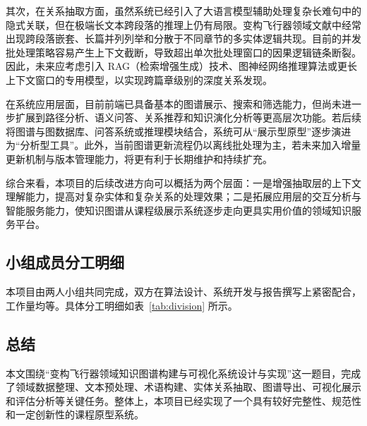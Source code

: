 其次，在关系抽取方面，虽然系统已经引入了大语言模型辅助处理复杂长难句中的隐式关联，但在极端长文本跨段落的推理上仍有局限。变构飞行器领域文献中经常出现跨段落嵌套、长篇并列列举和分散于不同章节的多实体逻辑共现。目前的并发批处理策略容易产生上下文截断，导致超出单次批处理窗口的因果逻辑链条断裂。因此，未来应考虑引入 RAG（检索增强生成）技术、图神经网络推理算法或更长上下文窗口的专用模型，以实现跨篇章级别的深度关系发现。

在系统应用层面，目前前端已具备基本的图谱展示、搜索和筛选能力，但尚未进一步扩展到路径分析、语义问答、关系推荐和知识演化分析等更高层次功能。若后续将图谱与图数据库、问答系统或推理模块结合，系统可从“展示型原型”逐步演进为“分析型工具”。此外，当前图谱更新流程仍以离线批处理为主，若未来加入增量更新机制与版本管理能力，将更有利于长期维护和持续扩充。

综合来看，本项目的后续改进方向可以概括为两个层面：一是增强抽取层的上下文理解能力，提高对复杂实体和复杂关系的处理效果；二是拓展应用层的交互分析与智能服务能力，使知识图谱从课程级展示系统逐步走向更具实用价值的领域知识服务平台。

\subsection{小组成员分工明细}
本项目由两人小组共同完成，双方在算法设计、系统开发与报告撰写上紧密配合，工作量均等。具体分工明细如表~\ref{tab:division} 所示。

\begin{table}[H]
\centering
\caption{小组成员分工明细}
\label{tab:division}
\renewcommand{\arraystretch}{1.3}
\end{table}

\subsection{总结}
本文围绕“变构飞行器领域知识图谱构建与可视化系统设计与实现”这一题目，完成了领域数据整理、文本预处理、术语构建、实体关系抽取、图谱导出、可视化展示和评估分析等关键任务。整体上，本项目已经实现了一个具有较好完整性、规范性和一定创新性的课程原型系统。
